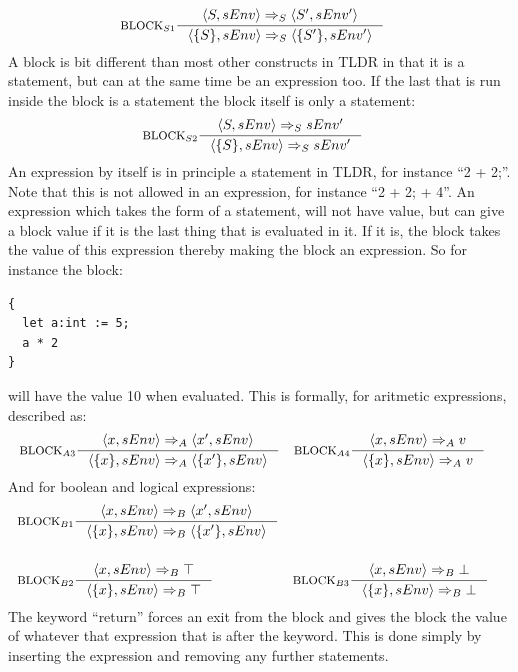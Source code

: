 \begin{align*}
&\inference[$\text{BLOCK}_{S1}$]{\Braket{S,sEnv} \Rightarrow_S \Braket{S',sEnv'}}
                                {\Braket{\{S\},sEnv} \Rightarrow_S \Braket{\{S'\},sEnv'}}
\end{align*}
A block is bit different than most other constructs in TLDR in that it is a statement, but can at the same time be an expression too. If the last that is run inside the block is a statement the block itself is only a statement:
\begin{align*}
&\inference[$\text{BLOCK}_{S2}$]{\Braket{S,sEnv} \Rightarrow_S sEnv'}
                                {\Braket{\{S\},sEnv} \Rightarrow_S sEnv'}
\end{align*}
An expression by itself is in principle a statement in TLDR, for instance \enquote{2 + 2;}. Note that this is not allowed in an expression, for instance \enquote{2 + 2; + 4}. An expression which takes the form of a statement, will not have value, but can give a block value if it is the last thing that is evaluated in it. If it is, the block takes the value of this expression thereby making the block an expression. So for instance the block:
\begin{lstlisting}
{
  let a:int := 5;
  a * 2
}
\end{lstlisting}
will have the value 10 when evaluated. This is formally, for aritmetic expressions, described as:
\begin{align*}
&\inference[$\text{BLOCK}_{A3}$]{\Braket{x,sEnv} \Rightarrow_A \Braket{x',sEnv}}
                         {\Braket{\{x\},sEnv} \Rightarrow_A \Braket{\{x'\},sEnv}}
&
&\inference[$\text{BLOCK}_{A4}$]{\Braket{x,sEnv} \Rightarrow_A v}
                         {\Braket{\{x\},sEnv} \Rightarrow_A v}
\end{align*}
And for boolean and logical expressions:
\begin{align*}
&\inference[$\text{BLOCK}_{B1}$]{\Braket{x,sEnv} \Rightarrow_B \Braket{x',sEnv}}
                         {\Braket{\{x\},sEnv} \Rightarrow_B \Braket{\{x'\},sEnv}}
\\\\
&\inference[$\text{BLOCK}_{B2}$]{\Braket{x,sEnv} \Rightarrow_B \top}
                         {\Braket{\{x\},sEnv} \Rightarrow_B \top}
&
&\inference[$\text{BLOCK}_{B3}$]{\Braket{x,sEnv} \Rightarrow_B \bot}
                         {\Braket{\{x\},sEnv} \Rightarrow_B \bot}
\end{align*}
The keyword \enquote{return} forces an exit from the block and gives the block the value of whatever that expression that is after the keyword. This is done simply by inserting the expression and removing any further statements.
